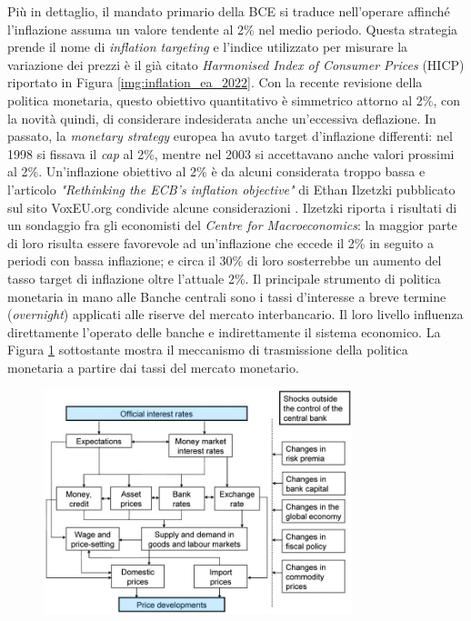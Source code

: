 Più in dettaglio, il mandato primario della BCE si traduce nell'operare affinché l'inflazione assuma un valore tendente al 2\% nel medio periodo. Questa strategia prende il nome di \textit{inflation targeting} e l'indice utilizzato per misurare la variazione dei prezzi è il già citato \textit{Harmonised Index of Consumer Prices} (HICP) riportato in Figura \ref{img:inflation_ea_2022}. Con la recente revisione della politica monetaria, questo obiettivo quantitativo è simmetrico attorno al 2\%, con la novità quindi, di considerare indesiderata anche un'eccessiva deflazione. In passato, la \textit{monetary strategy} europea ha avuto target d'inflazione differenti: nel 1998 si fissava il \textit{cap} al 2\%, mentre nel 2003 si accettavano anche valori prossimi al 2\%. Un'inflazione obiettivo al 2\% è da alcuni considerata troppo bassa e l'articolo \textit{"Rethinking the ECB's inflation objective"} di Ethan Ilzetzki pubblicato sul sito VoxEU.org condivide alcune considerazioni  \parencite{Ilzetzki:inflation_target}. Ilzetzki riporta i risultati di un sondaggio fra gli economisti del \textit{Centre for Macroeconomics}: la maggior parte di loro risulta essere favorevole ad un'inflazione che eccede il 2\% in seguito a periodi con bassa inflazione; e circa il 30\% di loro sosterrebbe un aumento del tasso target di inflazione oltre l'attuale 2\%. Il principale strumento di politica monetaria in mano alle Banche centrali sono i tassi d'interesse a breve termine (\textit{overnight}) applicati alle riserve del mercato interbancario. Il loro livello influenza direttamente l'operato delle banche e indirettamente il sistema economico. La Figura \ref{img:interest_rate_transmission} sottostante mostra il meccanismo di trasmissione della politica monetaria a partire dai tassi del mercato monetario.

\begin{figure}[h]
	\centering
	\includegraphics[width=0.80\textwidth]{img/interest_rates_transmission.pdf}
	\caption{}
	\label{img:interest_rate_transmission}
\end{figure}

